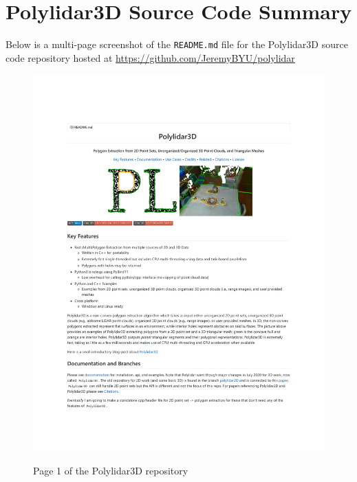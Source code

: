 
\section{Polylidar3D Source Code Summary} 
Below is a multi-page screenshot of the \texttt{README.md} file for the Polylidar3D source code repository hosted at \url{https://github.com/JeremyBYU/polylidar}

\begin{figure}[h!]
    \centering\includegraphics[page=1, trim=1.2in 1.2in 1.2in 1.2in, width=.82\linewidth]{appendix_1/imgs/Polylidar3DReadme.pdf}
    \label{fig:apx1_pl1}
    \caption{Page 1 of the Polylidar3D repository} 
\end{figure}

